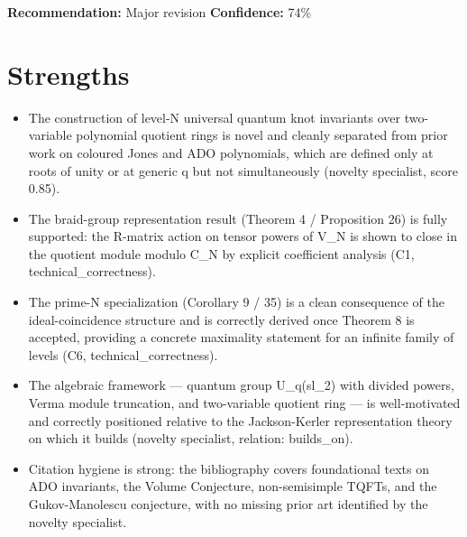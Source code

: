 \documentclass[11pt]{article}
\begin{document}
\textbf{Recommendation:} Major revision \quad \textbf{Confidence:} 74\%\\

\section*{Strengths}
\begin{itemize}[leftmargin=*]
  \item The construction of level-N universal quantum knot invariants over two-variable polynomial quotient rings is novel and cleanly separated from prior work on coloured Jones and ADO polynomials, which are defined only at roots of unity or at generic q but not simultaneously (novelty specialist, score 0.85).
  \item The braid-group representation result (Theorem 4 / Proposition 26) is fully supported: the R-matrix action on tensor powers of V\_N is shown to close in the quotient module modulo C\_N by explicit coefficient analysis (C1, technical\_correctness).
  \item The prime-N specialization (Corollary 9 / 35) is a clean consequence of the ideal-coincidence structure and is correctly derived once Theorem 8 is accepted, providing a concrete maximality statement for an infinite family of levels (C6, technical\_correctness).
  \item The algebraic framework --- quantum group U\_q(sl\_2) with divided powers, Verma module truncation, and two-variable quotient ring --- is well-motivated and correctly positioned relative to the Jackson-Kerler representation theory on which it builds (novelty specialist, relation: builds\_on).
  \item Citation hygiene is strong: the bibliography covers foundational texts on ADO invariants, the Volume Conjecture, non-semisimple TQFTs, and the Gukov-Manolescu conjecture, with no missing prior art identified by the novelty specialist.
\end{itemize}
\end{document}

